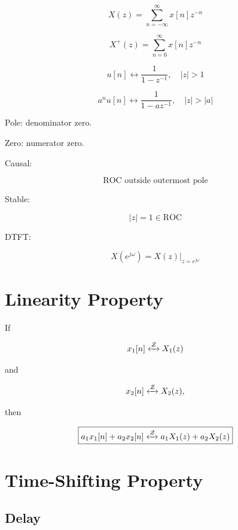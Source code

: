 \begin{tcolorbox}[title=One-Minute Revision,colback=blue!5]

\[
X(z)=
\sum_{n=-\infty}^{\infty}x[n]z^{-n}
\]

\[
X^+(z)=
\sum_{n=0}^{\infty}x[n]z^{-n}
\]

\[
u[n]\leftrightarrow
\frac{1}{1-z^{-1}},
\quad |z|>1
\]

\[
a^n u[n]\leftrightarrow
\frac{1}{1-az^{-1}},
\quad |z|>|a|
\]

Pole: denominator zero.

Zero: numerator zero.

Causal:

\[
\text{ROC outside outermost pole}
\]

Stable:

\[
|z|=1 \in \text{ROC}
\]

DTFT:

\[
X(e^{j\omega})=X(z)|_{z=e^{j\omega}}
\]

\end{tcolorbox}
\section{Linearity Property}

If

\[
x_1[n]\xleftrightarrow{\mathcal{Z}}X_1(z)
\]

and

\[
x_2[n]\xleftrightarrow{\mathcal{Z}}X_2(z),
\]

then

\[
\boxed{
a_1x_1[n]+a_2x_2[n]
\xleftrightarrow{\mathcal{Z}}
a_1X_1(z)+a_2X_2(z)
}
\]


\section{Time-Shifting Property}


\subsection{Delay}

